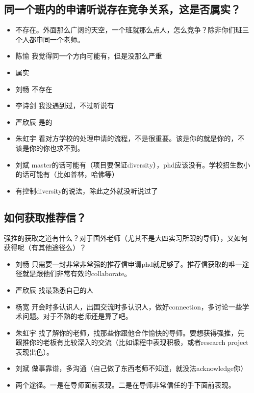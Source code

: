 \documentclass{vivid_layout}
\begin{document}
\subsection{同一个班内的申请听说存在竞争关系，这是否属实？ }
\begin{itemize}
\item 不存在。外面那么广阔的天空，一个班就那么点人，怎么竞争？除非你们班三个人都申同一个老师。
\item  { 陈愉}  \quad 我觉得同一个方向可能有，但是没那么严重
\item 属实
\item  { 刘畅}  \quad 不存在
\item  { 李诗剑}  \quad 我没遇到过，不过听说有
\item  { 严欣辰}  \quad 是的
\item  { 朱虹宇}  \quad 看对方学校的处理申请的流程，不是很重要。该是你的就是你的，不该是你的你也求不到。
\item  { 刘斌}  \quad master的话可能有（项目要保证diversity），phd应该没有。学校招生数小的话可能有（比如普林，哈佛等）
\item 有控制diversity的说法，除此之外就没听说过了
\end{itemize}

\subsection{如何获取推荐信？}
强推的获取之道有什么？对于国外老师（尤其不是大四实习所跟的导师），又如何获得呢（有其他途径么）？
\begin{itemize}
\item  { 刘畅}  \quad 只需要一封非常非常强的推荐信申请phd就足够了。推荐信获取的唯一途径就是跟他们非常有效的collaborate。
\item  { 严欣辰}  \quad 找最熟悉自己的人
\item  { 杨宽}  \quad 开会时多认识人，出国交流时多认识人，做好connection，多讨论一些学术问题。对于不熟的老师还是算了吧。
\item  { 朱虹宇}  \quad 找了解你的老师，找那些你跟他合作愉快的导师。要想获得强推，先跟推你的老板有比较深入的交流（比如课程中表现积极，或者research project表现出色）。
\item  { 刘斌}  \quad 做事靠谱，多沟通（自己做了东西老师不知道，就没法acknowledge你）
\item 两个途径。一是在导师面前表现。二是在导师非常信任的手下面前表现。
\end{itemize}
\end{document}
